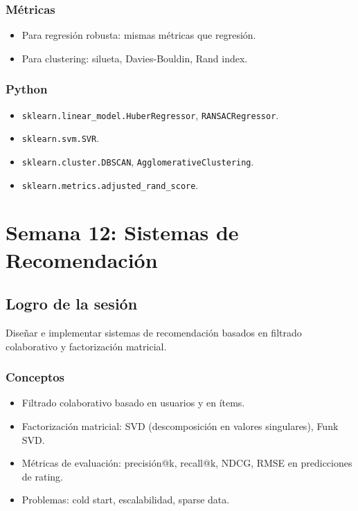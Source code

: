 \documentclass[12pt,a4paper,openany,oneside]{book}
\begin{document}
\subsection{Métricas}
\begin{itemize}
    \item Para regresión robusta: mismas métricas que regresión.
    \item Para clustering: silueta, Davies-Bouldin, Rand index.
\end{itemize}

\subsection{Python}
\begin{itemize}
    \item \texttt{sklearn.linear\_model.HuberRegressor}, \texttt{RANSACRegressor}.
    \item \texttt{sklearn.svm.SVR}.
    \item \texttt{sklearn.cluster.DBSCAN}, \texttt{AgglomerativeClustering}.
    \item \texttt{sklearn.metrics.adjusted\_rand\_score}.
\end{itemize}

\chapter{Semana 12: Sistemas de Recomendación}

\section{Logro de la sesión}
Diseñar e implementar sistemas de recomendación basados en filtrado colaborativo y factorización matricial.

\subsection{Conceptos}
\begin{itemize}
    \item Filtrado colaborativo basado en usuarios y en ítems.
    \item Factorización matricial: SVD (descomposición en valores singulares), Funk SVD.
    \item Métricas de evaluación: precisión@k, recall@k, NDCG, RMSE en predicciones de rating.
    \item Problemas: cold start, escalabilidad, sparse data.
\end{itemize}
\end{document}
